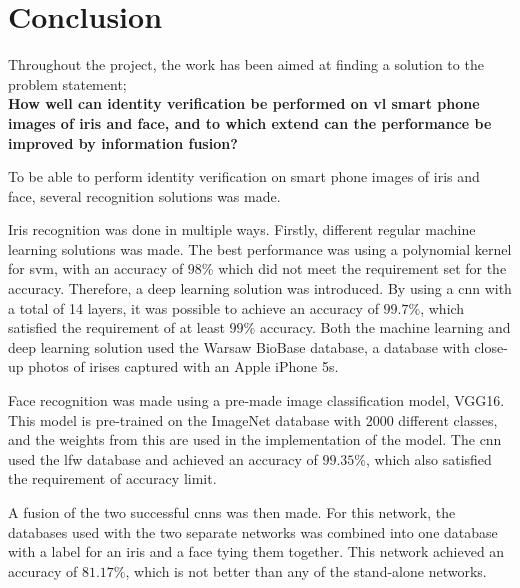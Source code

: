 \chapter{Conclusion}\label{ch:conclusion}\glsresetall
Throughout the project, the work has been aimed at finding a solution to the problem statement; \\
\textbf{How well can identity verification be performed on \gls{vl} smart phone images of iris and face, and to which extend can the performance be improved by information fusion?}

To be able to perform identity verification on smart phone images of iris and face, several recognition solutions was made.

Iris recognition was done in multiple ways. Firstly, different regular machine learning solutions was made. The best performance was using a polynomial kernel for \gls{svm}, with an accuracy of $98\%$ which did not meet the requirement set for the accuracy.
Therefore, a deep learning solution was introduced. By using a \gls{cnn} with a total of 14 layers, it was possible to achieve an accuracy of $99.7\%$, which satisfied the requirement of at least $99\%$ accuracy. 
Both the machine learning and deep learning solution used the Warsaw BioBase database, a database with close-up photos of irises captured with an Apple iPhone 5s.

Face recognition was made using a pre-made image classification model, VGG16. This model is pre-trained on the ImageNet database with 2000 different classes, and the weights from this are used in the implementation of the model. The \gls{cnn} used the \gls{lfw} database and achieved an accuracy of $99.35\%$, which also satisfied the requirement of accuracy limit.

A fusion of the two successful \gls{cnn}s was then made. For this network, the databases used with the two separate networks was combined into one database with a label for an iris and a face tying them together. This network achieved an accuracy of $81.17\%$, which is not better than any of the stand-alone networks.